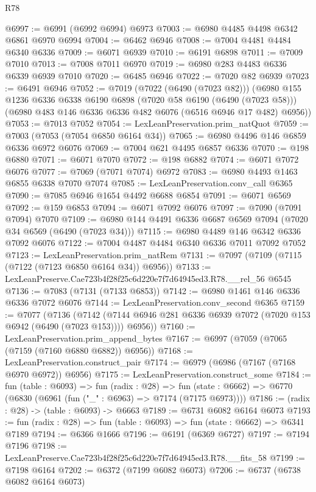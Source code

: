 \begin{lexlean}{R78}
\begin{coremodule}
@6997 := @6991 (@6992 @6994) @6973
@7003 := @6980 @4485 @4498 @6342 @6861 @6970 @6994
@7004 := @6462 @6946
@7008 := @7004 @4481 @4484 @6340 @6336
@7009 := @6071 @6939
@7010 := @6191 @6898
@7011 := @7009 @7010
@7013 := @7008 @7011 @6970
@7019 := @6980 @283 @4483 @6336 @6339 @6939 @7010
@7020 := @6485 @6946
@7022 := @7020 @82 @6939
@7023 := @6491 @6946
@7052 := @7019
    (@7022 (@6490 (@7023 @82)))
    (@6980
      @155
      @1236
      @6336
      @6338
      @6190
      @6898
      (@7020 @58 @6190 (@6490 (@7023 @58)))
      (@6980 @483 @146 @6336 @6336 @482 @6076 (@6516 @6946 @17 @482) @6956))
@7053 := @7013 @7052
@7054 := LexLeanPreservation.prim_natQuot
@7059 := @7003 (@7053 (@7054 @6850 @6164 @34))
@7065 := @6980 @4496 @146 @6859 @6336 @6972 @6076
@7069 := @7004 @621 @4495 @6857 @6336
@7070 := @198 @6880
@7071 := @6071 @7070
@7072 := @198 @6882
@7074 := @6071 @7072 @6076
@7077 := @7069 (@7071 @7074) @6972
@7083 := @6980 @4493 @1463 @6855 @6338 @7070 @7074
@7085 := LexLeanPreservation.conv_call @6365
@7090 := @7085 @6946 @1654 @4492 @6688 @6854
@7091 := @6071 @6569
@7092 := @159 @6853
@7094 := @6071 @7092 @6076
@7097 := @7090 (@7091 @7094) @7070
@7109 := @6980 @144 @4491 @6336 @6687 @6569 @7094 (@7020 @34 @6569 (@6490 (@7023 @34)))
@7115 := @6980 @4489 @146 @6342 @6336 @7092 @6076
@7122 := @7004 @4487 @4484 @6340 @6336 @7011 @7092 @7052
@7123 := LexLeanPreservation.prim_natRem
@7131 := @7097 (@7109 (@7115 (@7122 (@7123 @6850 @6164 @34)) @6956))
@7133 := LexLeanPreserve.Cae723b4f28f25c6d220e7f7d64945ed3.R78.__rel_56 @6545
@7136 := @7083 (@7131 (@7133 @6853))
@7142 := @6980 @1461 @146 @6336 @6336 @7072 @6076
@7144 := LexLeanPreservation.conv_second @6365
@7159 := @7077
    (@7136
      (@7142 (@7144 @6946 @281 @6336 @6939 @7072 (@7020 @153 @6942 (@6490 (@7023 @153)))) @6956))
@7160 := LexLeanPreservation.prim_append_bytes
@7167 := @6997 (@7059 (@7065 (@7159 (@7160 @6880 @6882)) @6956))
@7168 := LexLeanPreservation.construct_pair
@7174 := @6979 (@6986 (@7167 (@7168 @6970 @6972)) @6956)
@7175 := LexLeanPreservation.construct_some
@7184 := fun (table : @6093) =>
  fun (radix : @28) =>
  fun (state : @6662) => @6770 (@6830 (@6961 (fun ("_" : @6963) => @7174 (@7175 @6973))))
@7186 := (radix : @28) -> (table : @6093) -> @6663
@7189 := @6731 @6082 @6164 @6073
@7193 := fun (radix : @28) => fun (table : @6093) => fun (state : @6662) => @6341 @7189
@7194 := @6366 @1666
@7196 := @6191 (@6369 @6727)
@7197 := @7194 @7196
@7198 := LexLeanPreserve.Cae723b4f28f25c6d220e7f7d64945ed3.R78.__fits_58
@7199 := @7198 @6164
@7202 := @6372 (@7199 @6082 @6073)
@7206 := @6737 (@6738 @6082 @6164 @6073)

\end{coremodule}
\end{lexlean}

